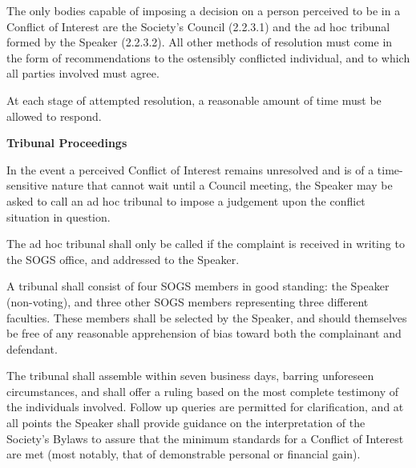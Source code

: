 \begin{longenum}[ label*=\arabic*., align=left]
\begin{longenum}[ label*=\arabic*., align=left]
\begin{longenum}[ label*=\arabic*., align=left]
		\end{longenum}
		\item The only bodies capable of imposing a decision on a person perceived to be in a Conflict of Interest are the Society's Council (2.2.3.1) and the ad hoc tribunal formed by the Speaker (2.2.3.2). All other methods of resolution must come in the form of recommendations to the ostensibly conflicted individual, and to which all parties involved must agree.
        \item At each stage of attempted resolution, a reasonable amount of time must be allowed to respond.
	\end{longenum}
	\item \textbf{Tribunal Proceedings}
	\begin{longenum}[ label*=\arabic*., align=left]
		\item In the event a perceived Conflict of Interest remains unresolved and is of a time-sensitive nature that cannot wait until a Council meeting, the Speaker may be asked to call an ad hoc tribunal to impose a judgement upon the conflict situation in question.
        \item The ad hoc tribunal shall only be called if the complaint is received in writing to the SOGS office, and addressed to the Speaker.

        \item A tribunal shall consist of four SOGS members in good standing: the Speaker (non-voting), and three other SOGS members representing three different faculties. These members shall be selected by the Speaker, and should themselves be free of any reasonable apprehension of bias toward both the complainant and defendant.

        \item The tribunal shall assemble within seven business days, barring unforeseen circumstances, and shall offer a ruling based on the most complete testimony of the individuals involved. Follow up queries are permitted for clarification, and at all points the Speaker shall provide guidance on the interpretation of the Society's Bylaws to assure that the minimum standards for a Conflict of Interest are met (most notably, that of demonstrable personal or financial gain).



\end{longenum}
\end{longenum}
